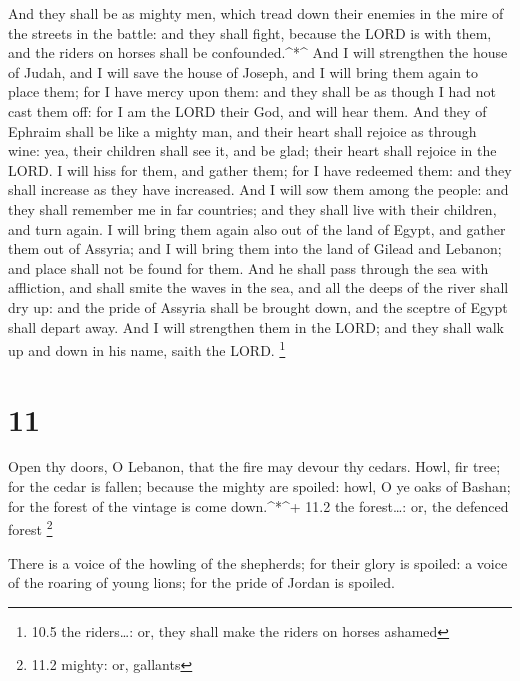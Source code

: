  And they shall be as mighty men, which tread down their
enemies in the mire of the streets in the battle: and they shall fight,
because the LORD is with them, and the riders on horses shall be
confounded.\^{}*\^{}  And I will strengthen the house of
Judah, and I will save the house of Joseph, and I will bring them again
to place them; for I have mercy upon them: and they shall be as though I
had not cast them off: for I am the LORD their God, and will hear them.
 And they of Ephraim shall be like a mighty man, and their
heart shall rejoice as through wine: yea, their children shall see it,
and be glad; their heart shall rejoice in the LORD.  I will
hiss for them, and gather them; for I have redeemed them: and they shall
increase as they have increased.  And I will sow them among
the people: and they shall remember me in far countries; and they shall
live with their children, and turn again.  I will bring
them again also out of the land of Egypt, and gather them out of
Assyria; and I will bring them into the land of Gilead and Lebanon; and
place shall not be found for them.  And he shall pass
through the sea with affliction, and shall smite the waves in the sea,
and all the deeps of the river shall dry up: and the pride of Assyria
shall be brought down, and the sceptre of Egypt shall depart away.
 And I will strengthen them in the LORD; and they shall
walk up and down in his name, saith the LORD. \footnote{10.5 the
  riders\ldots: or, they shall make the riders on horses ashamed}

\hypertarget{section-10}{%
\section{11}\label{section-10}}

 Open thy doors, O Lebanon, that the fire may devour thy
cedars.  Howl, fir tree; for the cedar is fallen; because
the mighty are spoiled: howl, O ye oaks of Bashan; for the forest of the
vintage is come down.\^{}*\^{}+ 11.2 the forest\ldots: or, the defenced
forest \footnote{11.2 mighty: or, gallants}

 There is a voice of the howling of the shepherds; for their
glory is spoiled: a voice of the roaring of young lions; for the pride
of Jordan is spoiled.

